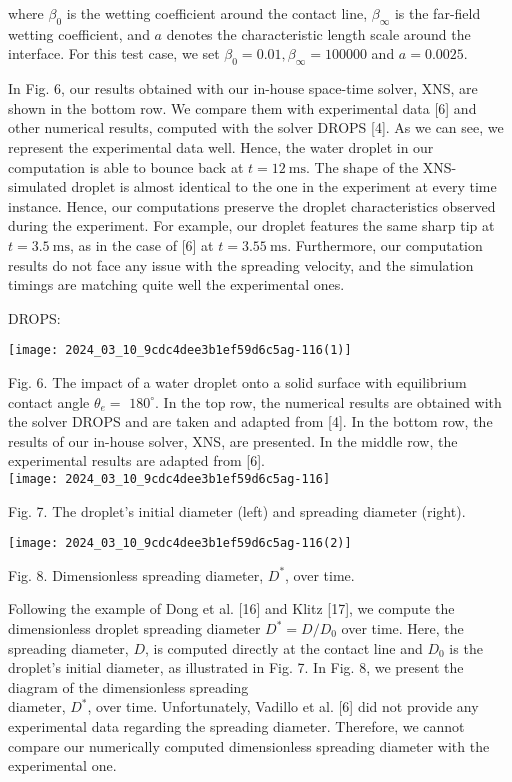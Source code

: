 \documentclass[10pt]{article}
\begin{document}
where $\beta_{0}$ is the wetting coefficient around the contact line, $\beta_{\infty}$ is the far-field wetting coefficient, and $a$ denotes the characteristic length scale around the interface. For this test case, we set $\beta_{0}=0.01, \beta_{\infty}=100000$ and $a=0.0025$.

In Fig. 6, our results obtained with our in-house space-time solver, XNS, are shown in the bottom row. We compare them with experimental data [6] and other numerical results, computed with the solver DROPS [4]. As we can see, we represent the experimental data well. Hence, the water droplet in our computation is able to bounce back at $t=12 \mathrm{~ms}$. The shape of the XNS-simulated droplet is almost identical to the one in the experiment at every time instance. Hence, our computations preserve the droplet characteristics observed during the experiment. For example, our droplet features the same sharp tip at $t=3.5 \mathrm{~ms}$, as in the case of [6] at $t=3.55 \mathrm{~ms}$. Furthermore, our computation results do not face any issue with the spreading velocity, and the simulation timings are matching quite well the experimental ones.

DROPS:

\begin{center}
\texttt{[image: 2024\_03\_10\_9cdc4dee3b1ef59d6c5ag-116(1)]}
\end{center}

Fig. 6. The impact of a water droplet onto a solid surface with equilibrium contact angle $\theta_{e}=$ $180^{\circ}$. In the top row, the numerical results are obtained with the solver DROPS and are taken and adapted from [4]. In the bottom row, the results of our in-house solver, XNS, are presented. In the middle row, the experimental results are adapted from [6].\\
\texttt{[image: 2024\_03\_10\_9cdc4dee3b1ef59d6c5ag-116]}

Fig. 7. The droplet's initial diameter (left) and spreading diameter (right).

\begin{center}
\texttt{[image: 2024\_03\_10\_9cdc4dee3b1ef59d6c5ag-116(2)]}
\end{center}

Fig. 8. Dimensionless spreading diameter, $D^{*}$, over time.

Following the example of Dong et al. [16] and Klitz [17], we compute the dimensionless droplet spreading diameter $D^{*}=D / D_{0}$ over time. Here, the spreading diameter, $D$, is computed directly at the contact line and $D_{0}$ is the droplet's initial diameter, as illustrated in Fig. 7. In Fig. 8, we present the diagram of the dimensionless spreading\\
diameter, $D^{*}$, over time. Unfortunately, Vadillo et al. [6] did not provide any experimental data regarding the spreading diameter. Therefore, we cannot compare our numerically computed dimensionless spreading diameter with the experimental one.
\end{document}
